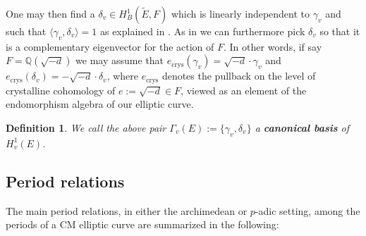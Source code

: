 \documentclass[12pt,twoside,a4paper]{article}
\theoremstyle{plain}%
\newtheorem{definition}[theorem]{Definition} %
\DeclareMathOperator{\crys}{crys}
\newcommand{\Q}{\mathbb{Q}}
\begin{document}
One may then find a $\delta_v\in H^1_B(\tilde{E},F)$ which is linearly independent to $\gamma_v$ and such that $\langle \gamma_v,\delta_v\rangle=1$ as explained in \cite{andremots}. As in \cite{andremots} we can furthermore pick $\delta_v$ so that it is a complementary eigenvector for the action of $F$. In other words, if say $F=\Q(\sqrt{-d})$ we may assume that $e_{\crys}(\gamma_v)=\sqrt{-d}\cdot \gamma_v$ and $e_{\crys}(\delta_v)=-\sqrt{-d}\cdot \delta_v$, where $e_{\crys}$ denotes the pullback on the level of crystalline cohomology of $e:=\sqrt{-d}\in F$, viewed as an element of the endomorphism algebra of our elliptic curve.

\begin{definition}\label{defcansuper}
	We call the above pair $\Gamma_v(E):=\{\gamma_v,\delta_v\}$ a \textbf{canonical basis} of $H^1_v(E)$.
\end{definition}



\subsection{Period relations}\label{section:cmperiods}

The main period relations, in either the archimedean or $p$-adic setting, among the periods of a CM elliptic curve are summarized in the following:
\end{document}
